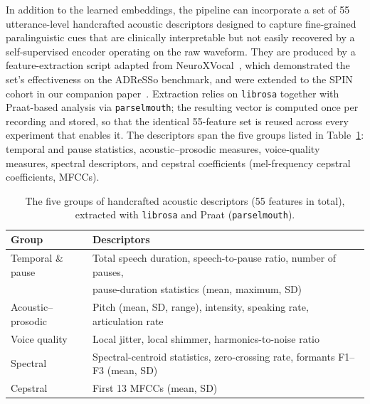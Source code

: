 \documentclass[a4paper,12pt]{article}
\begin{document}
In addition to the learned embeddings, the pipeline can incorporate a set of 55 utterance-level handcrafted acoustic descriptors designed to capture fine-grained paralinguistic cues that are clinically interpretable but not easily recovered by a self-supervised encoder operating on the raw waveform. They are produced by a feature-extraction script adapted from NeuroXVocal~\cite{ntampakis2025neuroxvocal}, which demonstrated the set's effectiveness on the ADReSSo benchmark, and were extended to the SPIN cohort in our companion paper~\cite{esteve2025speechadppa}. Extraction relies on \texttt{librosa} together with Praat-based analysis via \texttt{parselmouth}; the resulting vector is computed once per recording and stored, so that the identical 55-feature set is reused across every experiment that enables it. The descriptors span the five groups listed in Table~\ref{tab:handcrafted}: temporal and pause statistics, acoustic--prosodic measures, voice-quality measures, spectral descriptors, and cepstral coefficients (mel-frequency cepstral coefficients, MFCCs).

\begin{table}[H]
\centering
\caption[Handcrafted acoustic features]{\footnotesize The five groups of handcrafted acoustic descriptors (55 features in total), extracted with \texttt{librosa} and Praat (\texttt{parselmouth}).}
\label{tab:handcrafted}
\footnotesize{
\begin{tabular}{@{}ll@{}}
\toprule
\textbf{Group} & \textbf{Descriptors} \\ \midrule
Temporal \& pause   & Total speech duration, speech-to-pause ratio, number of pauses, \\
                    & pause-duration statistics (mean, maximum, SD) \\
Acoustic--prosodic  & Pitch (mean, SD, range), intensity, speaking rate, articulation rate \\
Voice quality       & Local jitter, local shimmer, harmonics-to-noise ratio \\
Spectral            & Spectral-centroid statistics, zero-crossing rate, formants F1--F3 (mean, SD) \\
Cepstral            & First 13 MFCCs (mean, SD) \\
\bottomrule
\end{tabular}
}
\end{table}
\end{document}
